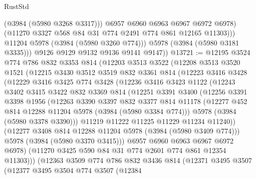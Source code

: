 \begin{lexlean}{RustStd}
\begin{coremodule}
                    (@3984 (@5980 @3268 @3317)))
                  @6957
                  @6960
                  @6963
                  @6967
                  @6972
                  @6978)
                (@11270 @3327 @568 @84 @31 @774 @2491 @774 @861 @12165 @11303)))
            @11204
            @5978
            (@3984 (@5980 @3260 @774)))
          @5978
          (@3984 (@5980 @3181 @3335)))
        @9126
        @9129
        @9132
        @9136
        @9141
        @9147))
@13721 := @12195
    @3524
    @774
    @786
    @832
    @3353
    @814
    (@12203
      @3513
      @3522
      (@12208
        @3513
        @3520
        @1521
        (@12215
          @3430
          @3512
          @3519
          @832
          @3361
          @814
          (@12223
            @3416
            @3428
            (@12229
              @3416
              @3425
              @774
              @3428
              (@12236
                @3416
                @3423
                @1122
                (@12243
                  @3402
                  @3415
                  @3422
                  @832
                  @3369
                  @814
                  (@12251
                    @3391
                    @3400
                    (@12256
                      @3391
                      @3398
                      @1956
                      (@12263
                        @3390
                        @3397
                        @832
                        @3377
                        @814
                        @11178
                        (@12277 @452 @814 @12288 @11204 @5978 (@3984 (@5980 @3384 @774)))
                        @5978
                        (@3984 (@5980 @3378 @3390)))
                      @11219
                      @11222
                      @11225
                      @11229
                      @11234
                      @11240))
                  (@12277 @3408 @814 @12288 @11204 @5978 (@3984 (@5980 @3409 @774)))
                  @5978
                  (@3984 (@5980 @3370 @3415)))
                @6957
                @6960
                @6963
                @6967
                @6972
                @6978)
              (@11270 @3425 @590 @84 @31 @774 @2601 @774 @861 @12354 @11303)))
          (@12363
            @3509
            @774
            @786
            @832
            @3436
            @814
            (@12371
              @3495
              @3507
              (@12377
                @3495
                @3504
                @774
                @3507
                (@12384

\end{coremodule}
\end{lexlean}
